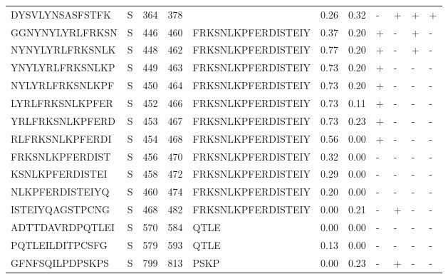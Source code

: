 \begin{tabular}{llrrlrrllll}
DYSVLYNSASFSTFK &       S &    364 &   378 &                     &            0.26 &             0.32 &      - &       + &      + &       + \\
GGNYNYLYRLFRKSN &       S &    446 &   460 &  FRKSNLKPFERDISTEIY &            0.37 &             0.20 &      + &       - &      + &       - \\
NYNYLYRLFRKSNLK &       S &    448 &   462 &  FRKSNLKPFERDISTEIY &            0.77 &             0.20 &      + &       - &      + &       - \\
YNYLYRLFRKSNLKP &       S &    449 &   463 &  FRKSNLKPFERDISTEIY &            0.73 &             0.20 &      + &       - &      - &       - \\
NYLYRLFRKSNLKPF &       S &    450 &   464 &  FRKSNLKPFERDISTEIY &            0.73 &             0.20 &      + &       - &      - &       - \\
LYRLFRKSNLKPFER &       S &    452 &   466 &  FRKSNLKPFERDISTEIY &            0.73 &             0.11 &      + &       - &      - &       - \\
YRLFRKSNLKPFERD &       S &    453 &   467 &  FRKSNLKPFERDISTEIY &            0.73 &             0.23 &      + &       - &      - &       - \\
RLFRKSNLKPFERDI &       S &    454 &   468 &  FRKSNLKPFERDISTEIY &            0.56 &             0.00 &      + &       - &      - &       - \\
FRKSNLKPFERDIST &       S &    456 &   470 &  FRKSNLKPFERDISTEIY &            0.32 &             0.00 &      - &       - &      - &       - \\
KSNLKPFERDISTEI &       S &    458 &   472 &  FRKSNLKPFERDISTEIY &            0.29 &             0.00 &      - &       - &      - &       - \\
NLKPFERDISTEIYQ &       S &    460 &   474 &  FRKSNLKPFERDISTEIY &            0.20 &             0.00 &      - &       - &      - &       - \\
ISTEIYQAGSTPCNG &       S &    468 &   482 &  FRKSNLKPFERDISTEIY &            0.00 &             0.21 &      - &       + &      - &       - \\
ADTTDAVRDPQTLEI &       S &    570 &   584 &                QTLE &            0.00 &             0.00 &      - &       - &      - &       - \\
PQTLEILDITPCSFG &       S &    579 &   593 &                QTLE &            0.13 &             0.00 &      - &       - &      - &       - \\
GFNFSQILPDPSKPS &       S &    799 &   813 &                PSKP &            0.00 &             0.23 &      - &       + &      - &       - \\

\end{tabular}
